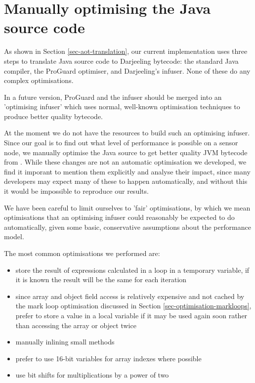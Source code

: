 \section{Manually optimising the Java source code}
\label{sec-optimisations-manual-java-source-optimisation}
As shown in Section \ref{sec-aot-translation}, our current implementation uses three steps to translate Java source code to Darjeeling bytecode: the standard Java compiler, the ProGuard optimiser, and Darjeeling's infuser. None of these do any complex optimisations. 

In a future version, ProGuard and the infuser should be merged into an 'optimising infuser' which uses normal, well-known optimisation techniques to produce better quality bytecode.

At the moment we do not have the resources to build such an optimising infuser. Since our goal is to find out what level of performance is possible on a sensor node, we manually optimise the Java source to get better quality JVM bytecode from . While these changes are not an automatic optimisation we developed, we find it imporant to mention them explicitly and analyse their impact, since many developers may expect many of these to happen automatically, and without this it would be impossible to reproduce our results.

We have been careful to limit ourselves to 'fair' optimisations, by which we mean optimisations that an optimising infuser could reasonably be expected to do automatically, given some basic, conservative assumptions about the performance model. 

The most common optimisations we performed are:
\begin{itemize}
	\item store the result of expressions calculated in a loop in a temporary variable, if it is known the result will be the same for each iteration
	\item since array and object field access is relatively expensive and not cached by the mark loop optimisation discussed in Section \ref{sec-optimisation-markloops}, prefer to store a value in a local variable if it may be used again soon rather than accessing the array or object twice
	\item manually inlining small methods
	\item prefer to use 16-bit variables for array indexes where possible
	\item use bit shifts for multiplications by a power of two
\end{itemize}

